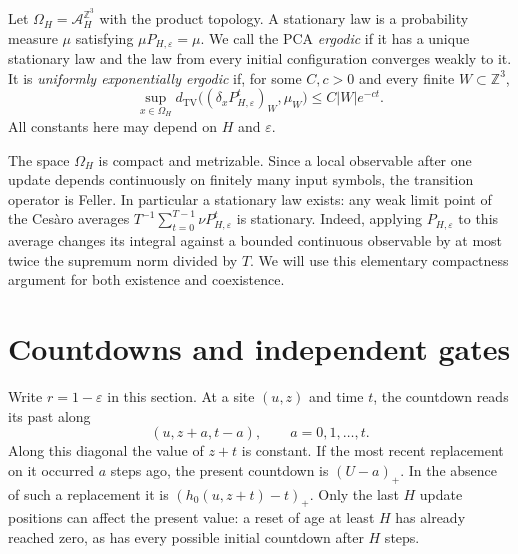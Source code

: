 \documentclass[11pt]{article}
\theoremstyle{plain}
\theoremstyle{definition}
\theoremstyle{remark}
\newcommand{\Z}{\mathbb Z}
\newcommand{\eps}{\varepsilon}
\newcommand{\A}{\mathcal A}
\newcommand{\dtv}{d_{\mathrm{TV}}}
\begin{document}
Let $\Omega_H=\A_H^{\Z^3}$ with the product topology. A stationary law is a probability measure $\mu$ satisfying $\mu P_{H,\eps}=\mu$. We call the PCA \emph{ergodic} if it has a unique stationary law and the law from every initial configuration converges weakly to it. It is \emph{uniformly exponentially ergodic} if, for some $C,c>0$ and every finite $W\subset\Z^3$,
\begin{equation}\label{eq:uee}
 \sup_{x\in\Omega_H}\dtv\bigl((\delta_xP_{H,\eps}^t)_W,\mu_W\bigr)
 \leq C|W|e^{-ct}.
\end{equation}
All constants here may depend on $H$ and $\eps$.

The space $\Omega_H$ is compact and metrizable. Since a local observable after one update depends continuously on finitely many input symbols, the transition operator is Feller. In particular a stationary law exists: any weak limit point of the Ces\`aro averages $T^{-1}\sum_{t=0}^{T-1}\nu P_{H,\eps}^t$ is stationary. Indeed, applying $P_{H,\eps}$ to this average changes its integral against a bounded continuous observable by at most twice the supremum norm divided by $T$. We will use this elementary compactness argument for both existence and coexistence.

\section{Countdowns and independent gates}\label{sec:clocks}

Write $r=1-\eps$ in this section. At a site $(u,z)$ and time $t$, the countdown reads its past along
\begin{equation}\label{eq:characteristic}
 (u,z+a,t-a),\qquad a=0,1,\ldots,t.
\end{equation}
Along this diagonal the value of $z+t$ is constant. If the most recent replacement on it occurred $a$ steps ago, the present countdown is $(U-a)_+$. In the absence of such a replacement it is $(h_0(u,z+t)-t)_+$. Only the last $H$ update positions can affect the present value: a reset of age at least $H$ has already reached zero, as has every possible initial countdown after $H$ steps.
\end{document}
